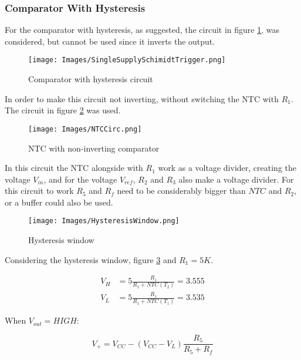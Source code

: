 \subsubsection{Comparator With Hysteresis}

For the comparator with hysteresis, as suggested, the circuit in figure \ref{fig:ComparatorCirc}, was considered, but cannot be used since it inverts the output.

\begin{figure}[H]
    \centering
    \texttt{[image: Images/SingleSupplySchimidtTrigger.png]}
    \caption{Comparator with hysteresis circuit \textsuperscript{\cite{NTC_datasheet}}}
    \label{fig:ComparatorCirc}
\end{figure}

In order to make this circuit not inverting, without switching the NTC with $R_{1}$. The circuit in figure \ref{fig:NTCCirc} was used.

\begin{figure}[H]
    \centering
    \texttt{[image: Images/NTCCirc.png]}
    \caption{NTC with non-inverting comparator}
    \label{fig:NTCCirc}
\end{figure}

In this circuit the NTC alongside with $R_1$ work as a voltage divider, creating the voltage $V_{in}$, and for the voltage $V_{ref}$, $R_2$ and $R_3$ also make a voltage divider. 
For this circuit to work $R_5$ and $R_f$ need to be considerably bigger than $NTC$ and $R_2$, or a buffer could also be used.

\begin{figure}[H]
    \centering
    \texttt{[image: Images/HysteresisWindow.png]}
    \caption{Hysteresis window}
    \label{fig:HysterWindow}
\end{figure}

Considering the hysteresis window, figure \ref{fig:HysterWindow} and $R_1 = 5K$.

\begin{equation}
    \begin{aligned}
        V_H &= 5\frac{R_1}{R_1 + NTC(T_2)} = 3.555\\
        V_L &= 5\frac{R_1}{R_1 + NTC(T_1)} = 3.535
    \end{aligned}
\end{equation}


When $V_{out} = HIGH$:

\begin{equation}
    V_+ = V_{CC}-\left (V_{CC}-V_L\right )\frac{R_5}{R_5 + R_f}
\end{equation}

